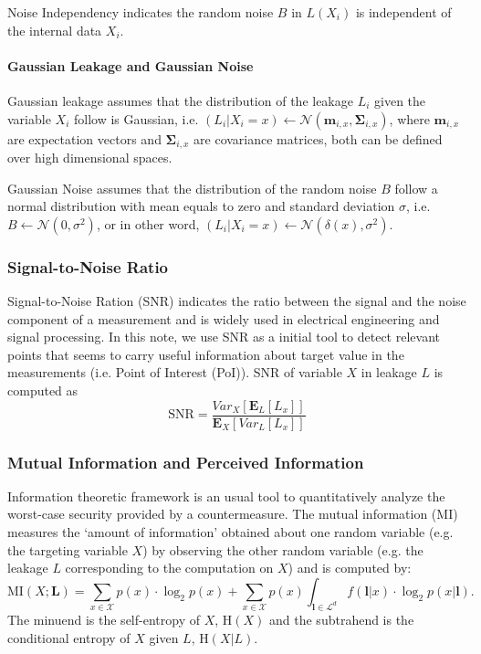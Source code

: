 \documentclass{llncs}
\begin{document}
Noise Independency indicates the random noise $B$ in $L(X_i)$ is independent of the internal data $X_i$. 
\paragraph{Gaussian Leakage and Gaussian Noise}
Gaussian leakage assumes that the distribution of the leakage $L_i$ given the variable $X_i$ follow is Gaussian, i.e. $(L_i|X_i=x) \leftarrow \mathcal{N}(\bm{m}_{i, x}, \bm{\Sigma}_{i, x})$, where $\bm{m}_{i, x}$ are expectation vectors and $\bm{\Sigma}_{i, x}$ are covariance matrices, both can be defined over high dimensional spaces.

Gaussian Noise assumes that the distribution of the random noise $B$ follow a normal distribution with mean equals to zero and standard deviation $\sigma$, i.e. $B \leftarrow \mathcal{N}(0, \sigma^2)$, or in other word, $(L_i|X_i=x) \leftarrow \mathcal{N}(\delta(x), \sigma^2)$.
\subsubsection*{Signal-to-Noise Ratio}
Signal-to-Noise Ration (SNR) indicates the ratio between the signal and the noise component of a measurement and is widely used in electrical engineering and signal processing. In this note, we use SNR as a initial tool to detect relevant points that seems to carry useful information about target value in the measurements (i.e. Point of Interest (PoI)).
SNR of variable $X$ in leakage $L$ is computed as
\begin{equation*}
	\text{SNR} = \frac{Var_{X}[\mathbf{E}_L[L_x]]}{\mathbf{E}_{X}[Var_L[L_x]]}
\end{equation*}
\subsubsection*{Mutual Information and Perceived Information}
\medspace
Information theoretic framework  is an usual tool to quantitatively analyze the worst-case security provided by a countermeasure. The mutual information (MI) measures the `amount of information'  obtained about one random variable (e.g. the targeting variable $X$) by observing the other random variable (e.g. the leakage $L$ corresponding to the computation on $X$) and is computed by:
\begin{equation}\label{eq:mi}
	\text{MI}(X; \mathbf{L})  = \sum_{x\in \mathcal{X}} p(x)\cdot \log_2 p(x) + \sum_{x \in \mathcal{X}} p(x)\int_{\bm{l}\in \mathcal{L}^d}f(\bm{l}|x)\cdot \log_2 p(x|\bm{l}).
\end{equation}
The minuend is the self-entropy of $X$, $\text{H}(X)$ and the subtrahend is the conditional entropy of $X$ given $L$, $\text{H}(X|L)$. 
\end{document}
